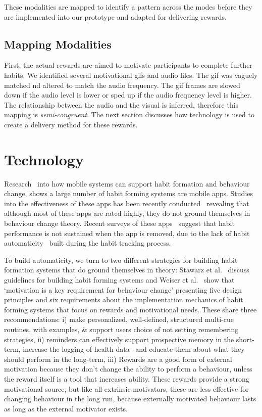 \documentclass{scaffold/sigchi}
\begin{document}
These modalities are mapped to identify a pattern across the modes before they are implemented into our prototype and adapted for delivering rewards.

\subsection{Mapping Modalities}
First, the actual rewards are aimed to motivate participants to complete further habits. We identified several motivational gifs and audio files. The gif was vaguely matched nd altered to match the audio frequency. The gif frames are slowed down if the audio level is lower or sped up if the audio frequency level is higher. The relationship between the audio and the visual is inferred, therefore this mapping is \textit{semi-congruent}. The next section discusses how technology is used to create a delivery method for these rewards.

\section{Technology}
Research~\cite{survey_on_apps_2,survey_on_current_apps_of_steel} into how mobile systems can support habit formation and behaviour change, shows a large number of habit forming systems are mobile apps. Studies into the effectiveness of these apps has been recently conducted~\cite{article_beyond_self_tracking_designing_apps, article_dont_kick_habit} revealing that although most of these apps are rated highly, they do not ground themselves in behaviour change theory. Recent surveys of these apps~\cite{survey_on_current_apps_of_steel,survey_on_apps_2} suggest that habit performance is not sustained when the app is removed, due to the lack of habit automaticity~\cite{article_beyond_self_tracking_designing_apps} built during the habit tracking process.

To build automaticity, we turn to two different strategies for building habit formation systems that do ground themselves in theory: Stawarz et al.~\cite{article_beyond_self_tracking_designing_apps} discuss guidelines for building habit forming systems and Weiser et al.~\cite{article_taxonomy_motivational_affordances_meaningful} show that `motivation is a key requirement for behaviour change' presenting five design principles and six requirements about the implementation mechanics of habit forming systems that focus on rewards and motivational needs. These share three recommendations: i) make personalized, well-defined, structured multi-cue routines, with examples, \& support users choice of not setting remembering strategies, ii) reminders can effectively support prospective memory in the short-term, increase the logging of health data~\cite{the_power_of_logging_mobile_notifications} and educate them about what they should perform in the long-term, iii) Rewards are a good form of external motivation because they don't change the ability to perform a behaviour, unless the reward itself is a tool that increases ability. These rewards provide a strong motivational source, but like all extrinsic motivators, these are less effective for changing behaviour in the long run, because externally motivated behaviour lasts as long as the external motivator exists.
\end{document}

